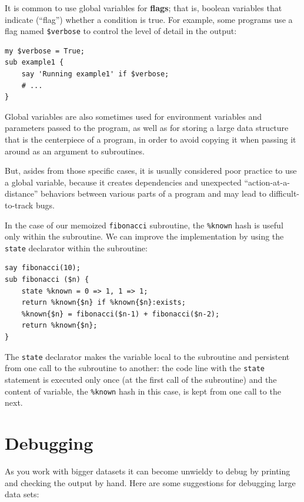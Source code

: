 It is common to use global variables for {\bf flags}; that is, 
boolean variables that indicate (``flag'') whether a condition
is true.  For example, some programs use a flag named 
\verb'$verbose' to control the level of detail in the
output:

\begin{verbatim}
my $verbose = True;
sub example1 {
    say 'Running example1' if $verbose;
    # ...
}
\end{verbatim}
%

Global variables are also sometimes used for environment 
variables and parameters passed to the program, as well
as for storing a large 
data structure that is the centerpiece of a program, in order 
to avoid copying it when passing it around as an argument to 
subroutines.

But, asides from those specific cases, it is usually 
considered poor practice to use a global variable, because 
it creates dependencies and unexpected ``action-at-a-distance'' 
behaviors between various parts of a program and may lead to 
difficult-to-track bugs.

In the case of our memoized \verb'fibonacci' subroutine, the 
\verb'%known' hash is useful only within the subroutine. We 
can improve the implementation by using the \verb'state' 
declarator within the subroutine:

\begin{verbatim}
say fibonacci(10);
sub fibonacci ($n) {
    state %known = 0 => 1, 1 => 1;
    return %known{$n} if %known{$n}:exists;
    %known{$n} = fibonacci($n-1) + fibonacci($n-2);
    return %known{$n};
}
\end{verbatim}
%
The \verb'state' declarator makes the variable local to the 
subroutine and persistent from one call to the subroutine to 
another: the code line with the \verb'state' statement is 
executed only once (at the first call of the subroutine) 
and the content of variable, the \verb'%known' hash in this 
case, is kept from one call to the next.



\section{Debugging}

As you work with bigger datasets it can become unwieldy to
debug by printing and checking the output by hand.  Here are some
suggestions for debugging large data sets:

